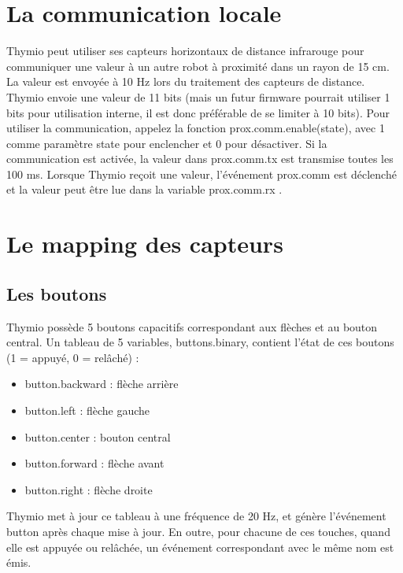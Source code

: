 \documentclass[a4paper, 12pt]{report}
\begin{document}
\section{La communication locale}
Thymio peut utiliser ses capteurs horizontaux de distance infrarouge pour communiquer une valeur à un autre robot à proximité dans un rayon de 15 cm. La valeur est envoyée à 10 Hz lors du traitement des capteurs de distance. Thymio envoie une valeur de 11 bits (mais un futur firmware pourrait utiliser 1 bits pour utilisation interne, il est donc préférable de se limiter à 10 bits). Pour utiliser la communication, appelez la fonction prox.comm.enable(state), avec 1 comme paramètre state pour enclencher et 0 pour désactiver. Si la communication est activée, la valeur dans prox.comm.tx est transmise toutes les 100 ms. Lorsque Thymio reçoit une valeur, l'événement prox.comm est déclenché et la valeur peut être lue dans la variable prox.comm.rx .
\section{Le mapping des capteurs}
\subsection{Les boutons \cite{thymio2016}}
Thymio possède 5 boutons capacitifs correspondant aux flèches et au bouton central. Un tableau de 5 variables, buttons.binary, contient l'état de ces boutons (1 = appuyé, 0 = relâché) :\\
\begin{itemize}
\item button.backward : flèche arrière
\item button.left : flèche gauche
\item button.center : bouton central
\item button.forward : flèche avant
\item button.right : flèche droite
\end{itemize}
Thymio met à jour ce tableau à une fréquence de 20 Hz, et génère l'événement button après chaque mise à jour. En outre, pour chacune de ces touches, quand elle est appuyée ou relâchée, un événement correspondant avec le même nom est émis.
\end{document}
